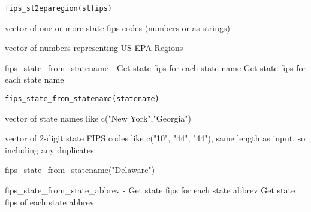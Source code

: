 \documentclass[a4paper]{book}
\begin{document}
%
\begin{Usage}
\begin{verbatim}
fips_st2eparegion(stfips)
\end{verbatim}
\end{Usage}
%
\begin{Arguments}
\begin{ldescription}
\item[\code{stfips}] vector of one or more state fips codes (numbers or as strings)
\end{ldescription}
\end{Arguments}
%
\begin{Value}
vector of numbers representing US EPA Regions
\end{Value}
%
\begin{Description}\relax
fips\_state\_from\_statename - Get state fips for each state name
Get state fips for each state name
\end{Description}
%
\begin{Usage}
\begin{verbatim}
fips_state_from_statename(statename)
\end{verbatim}
\end{Usage}
%
\begin{Arguments}
\begin{ldescription}
\item[\code{statename}] vector of state names like c("New York","Georgia")
\end{ldescription}
\end{Arguments}
%
\begin{Value}
vector of 2-digit state FIPS codes like c("10", "44", "44"),
same length as input, so including any duplicates
\end{Value}
%
\begin{Examples}
\begin{ExampleCode}
  fips_state_from_statename("Delaware")
\end{ExampleCode}
\end{Examples}
%
\begin{Description}\relax
fips\_state\_from\_state\_abbrev - Get state fips for each state abbrev
Get state fips of each state abbrev
\end{Description}
\end{document}
